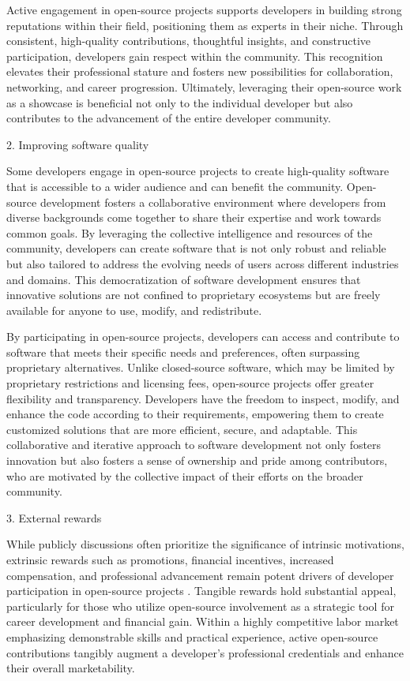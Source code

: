 Active engagement in open-source projects supports developers in building strong reputations within their field, positioning them as experts in their niche. Through consistent, high-quality contributions, thoughtful insights, and constructive participation, developers gain respect within the community. This recognition elevates their professional stature and fosters new possibilities for collaboration, networking, and career progression. Ultimately, leveraging their open-source work as a showcase is beneficial not only to the individual developer but also contributes to the advancement of the entire developer community.

2. Improving software quality

Some developers engage in open-source projects to create high-quality software that is accessible to a wider audience and can benefit the community. Open-source development fosters a collaborative environment where developers from diverse backgrounds come together to share their expertise and work towards common goals. By leveraging the collective intelligence and resources of the community, developers can create software that is not only robust and reliable but also tailored to address the evolving needs of users across different industries and domains. This democratization of software development ensures that innovative solutions are not confined to proprietary ecosystems but are freely available for anyone to use, modify, and redistribute.

By participating in open-source projects, developers can access and contribute to software that meets their specific needs and preferences, often surpassing proprietary alternatives. Unlike closed-source software, which may be limited by proprietary restrictions and licensing fees, open-source projects offer greater flexibility and transparency. Developers have the freedom to inspect, modify, and enhance the code according to their requirements, empowering them to create customized solutions that are more efficient, secure, and adaptable. This collaborative and iterative approach to software development not only fosters innovation but also fosters a sense of ownership and pride among contributors, who are motivated by the collective impact of their efforts on the broader community.

3. External rewards

While publicly discussions often prioritize the significance of intrinsic motivations, extrinsic rewards such as promotions, financial incentives, increased compensation, and professional advancement remain potent drivers of developer participation in open-source projects \cite{05bitzer2007intrinsic,06ye2003toward,07zhao2024openrank,11gerosa2021shifting,13li2012leadership,15roberts2006understanding,17alexander2002working,18oreg2008exploring}. Tangible rewards hold substantial appeal, particularly for those who utilize open-source involvement as a strategic tool for career development and financial gain. Within a highly competitive labor market emphasizing demonstrable skills and practical experience, active open-source contributions tangibly augment a developer's professional credentials and enhance their overall marketability.

